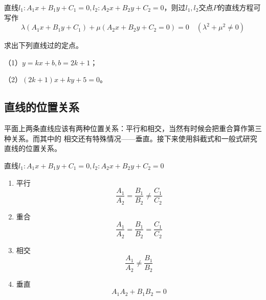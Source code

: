 \begin{theorem}
    直线\(l_1:A_1x+B_1y+C_1=0,l_2:A_2x+B_2y+C_2=0\)，则过\(l_1,l_2\)交点\(P\)的直线方程可写作
    \begin{equation}
        \lambda(A_1x+B_1y+C_1)+\mu(A_2x+B_2y+C_2=0)=0\quad (\lambda^2+\mu^2\neq 0)
    \end{equation}
\end{theorem}

\begin{example} 求出下列直线过的定点。

    （1）\(y=kx+b, b=2k+1\)；
    
    （2）\((2k+1)x+ky+5=0\)。
\end{example}
\clearpage
\subsection{直线的位置关系}
平面上两条直线应该有两种位置关系：平行和相交，当然有时候会把重合算作第三种关系。而其中的
相交还有特殊情况——垂直。接下来使用斜截式和一般式研究直线的位置关系。
\begin{theorem}
    直线\(l_1:A_1x+B_1y+C_1=0,l_2:A_2x+B_2y+C_2=0\)
\begin{enumerate}[(1)]
    \item 平行
    \begin{equation}
        \frac{A_1}{A_2}=\frac{B_1}{B_2}\neq \frac{C_1}{C_2}
    \end{equation}
    \item 重合
    \begin{equation}
        \frac{A_1}{A_2}=\frac{B_1}{B_2}=\frac{C_1}{C_2}
    \end{equation}
    \item 相交
    \begin{equation}
        \frac{A_1}{A_2}\neq \frac{B_1}{B_2}
    \end{equation}
    \item 垂直
    \begin{equation}
        A_1A_2+B_1B_2=0
    \end{equation}
\end{enumerate}
\end{theorem}


